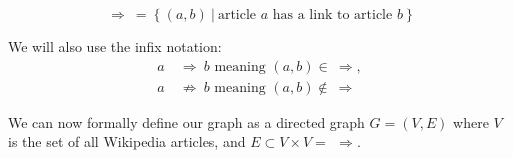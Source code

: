 $$\Rightarrow\ =\ \{\ (a,b)\ |\ \text{article } a \text{ has a link to article } b\ \}$$

We will also use the infix notation:
\begin{align*}
a\ &\Rightarrow\ b \text{ meaning } (a,b) \in\ \Rightarrow,\\
a\ &\not\Rightarrow\ b \text{ meaning } (a,b) \not\in\ \Rightarrow
\end{align*}

We can now formally define our graph as a directed graph $G = (V,E)$ where $V$ is the set of all Wikipedia articles, and $E\subset V \times V = \ \, \Rightarrow$.

